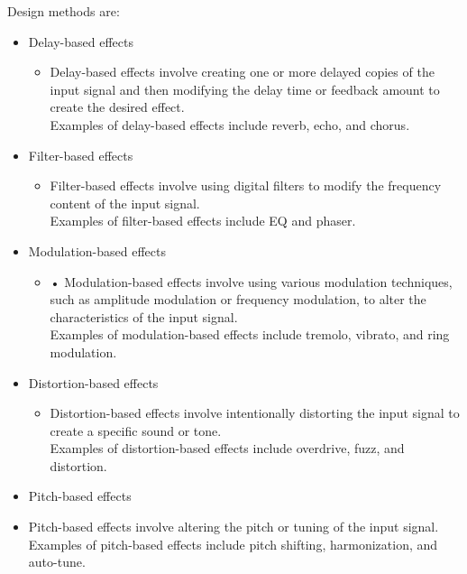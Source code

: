         Design methods are:
        \begin{itemize}
            \setlength\itemsep{-0.3em}
            \item Delay-based effects
            \begin{itemize}
                \setlength\itemsep{-0.3em}
                \item Delay-based effects involve creating one or more delayed copies of the input signal and then modifying the delay time or feedback amount to create the desired effect. \\
                Examples of delay-based effects include reverb, echo, and chorus.
            \end{itemize}
            \item Filter-based effects
            \begin{itemize}
                \setlength\itemsep{-0.3em}
                \item Filter-based effects involve using digital filters to modify the frequency content of the input signal. \\
                Examples of filter-based effects include EQ and phaser.   
            \end{itemize}
            \item Modulation-based effects
            \begin{itemize}
                \setlength\itemsep{-0.3em}
                \item •	Modulation-based effects involve using various modulation techniques, such as amplitude modulation or frequency modulation, to alter the characteristics of the input signal. \\
                Examples of modulation-based effects include tremolo, vibrato, and ring modulation.                
            \end{itemize}
            \item Distortion-based effects
            \begin{itemize}
                \setlength\itemsep{-0.3em}
                \item Distortion-based effects involve intentionally distorting the input signal to create a specific sound or tone. \\
                Examples of distortion-based effects include overdrive, fuzz, and distortion.
            \end{itemize}
            \item Pitch-based effects
            \setlength\itemsep{-0.3em}
            \item Pitch-based effects involve altering the pitch or tuning of the input signal. \\
            Examples of pitch-based effects include pitch shifting, harmonization, and auto-tune.
        \end{itemize}


